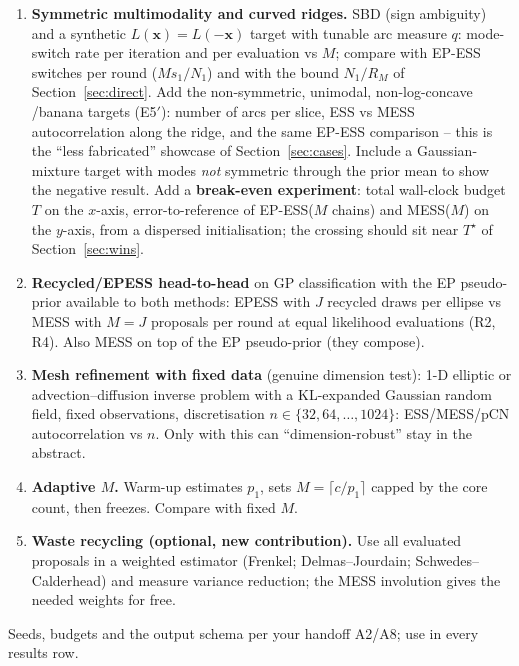\documentclass[11pt,a4paper]{article}
\theoremstyle{remark}
\newcommand{\bx}{\bm{x}}
\begin{document}
\begin{enumerate}[leftmargin=*,label=\textbf{E\arabic*}]
\item \textbf{Symmetric multimodality and curved ridges.} SBD (sign ambiguity) and a synthetic $L(\bx)=L(-\bx)$ target with tunable arc measure $q$: mode-switch rate per iteration and per evaluation vs $M$; compare with EP-ESS switches per round ($Ms_1/N_1$) and with the bound $N_1/R_M$ of Section~\ref{sec:direct}. Add the non-symmetric, unimodal, non-log-concave /banana targets (E5$'$): number of arcs per slice, ESS vs MESS autocorrelation along the ridge, and the same EP-ESS comparison -- this is the ``less fabricated'' showcase of Section~\ref{sec:cases}. Include a Gaussian-mixture target with modes \emph{not} symmetric through the prior mean to show the negative result. Add a \textbf{break-even experiment}: total wall-clock budget $T$ on the $x$-axis, error-to-reference of EP-ESS($M$ chains) and MESS($M$) on the $y$-axis, from a dispersed initialisation; the crossing should sit near $T^\star$ of Section~\ref{sec:wins}.
\item \textbf{Recycled/EPESS head-to-head} on GP classification with the EP pseudo-prior available to both methods: EPESS with $J$ recycled draws per ellipse vs MESS with $M=J$ proposals per round at equal likelihood evaluations (R2, R4). Also MESS on top of the EP pseudo-prior (they compose).
\item \textbf{Mesh refinement with fixed data} (genuine dimension test): 1-D elliptic or advection--diffusion inverse problem with a KL-expanded Gaussian random field, fixed observations, discretisation $n\in\{32,64,\dots,1024\}$: ESS/MESS/pCN autocorrelation vs $n$. Only with this can ``dimension-robust'' stay in the abstract.
\item \textbf{Adaptive $M$.} Warm-up estimates $p_1$, sets $M=\lceil c/p_1\rceil$ capped by the core count, then freezes. Compare with fixed $M$.
\item \textbf{Waste recycling (optional, new contribution).} Use all evaluated proposals in a weighted estimator (Frenkel; Delmas--Jourdain; Schwedes--Calderhead) and measure variance reduction; the MESS involution gives the needed weights for free.
\end{enumerate}
Seeds, budgets and the output schema per your handoff A2/A8; use  in every results row.

\end{document}

